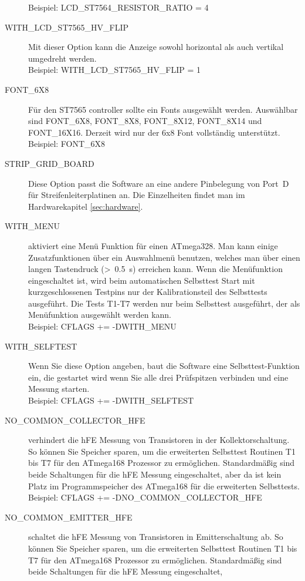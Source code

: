 \begin{description}
Beispiel: LCD\_ST7564\_RESISTOR\_RATIO = 4
  \item[WITH\_LCD\_ST7565\_HV\_FLIP] Mit dieser Option kann die Anzeige sowohl horizontal als auch vertikal
umgedreht werden.\\
Beispiel: WITH\_LCD\_ST7565\_HV\_FLIP = 1
  \item[FONT\_6X8] Für den ST7565 controller sollte ein Fonts ausgewählt werden.
Auswählbar  sind FONT\_6X8, FONT\_8X8, FONT\_8X12, FONT\_8X14 und FONT\_16X16.
Derzeit wird nur der 6x8 Font vollständig unterstützt.\\
Beispiel: FONT\_6X8
  \item[STRIP\_GRID\_BOARD] Diese Option passt die Software an eine andere Pinbelegung von Port~D für Streifenleiterplatinen an.
Die Einzelheiten findet man im Hardwarekapitel \ref{sec:hardware}.
  \item[WITH\_MENU] aktiviert eine Menü Funktion für einen ATmega328.  Man kann einige Zusatzfunktionen über ein
Auswahlmenü benutzen, welches man über einen langen Tastendruck (\textgreater~0.5~s) erreichen kann.
Wenn die Menüfunktion eingeschaltet ist, wird beim automatischen Selbsttest Start mit kurzgeschlossenen Testpins
 nur der Kalibrationsteil des Selbsttests ausgeführt.
Die Tests T1-T7 werden nur beim Selbsttest ausgeführt, der als Menüfunktion ausgewählt werden kann.\\
Beispiel: CFLAGS += -DWITH\_MENU
  \item[WITH\_SELFTEST] Wenn Sie diese Option angeben, baut die Software eine Selbsttest-Funktion ein, die gestartet wird
wenn Sie alle drei Prüfspitzen verbinden und eine Messung starten.\\
Beispiel: CFLAGS += -DWITH\_SELFTEST
  \item[NO\_COMMON\_COLLECTOR\_HFE] verhindert die hFE Messung von Transistoren in der Kollektorschaltung.
So können Sie Speicher sparen, um die erweiterten Selbsttest Routinen T1 bis T7 für den ATmega168 Prozessor zu ermöglichen.
Standardmäßig sind beide Schaltungen für die hFE Messung eingeschaltet,
aber da ist kein Platz im Programmspeicher des ATmega168 für die erweiterten Selbsttests.\\
Beispiel: CFLAGS += -DNO\_COMMON\_COLLECTOR\_HFE
  \item[NO\_COMMON\_EMITTER\_HFE] schaltet die hFE Messung von Transistoren in Emitterschaltung ab.
So können Sie Speicher sparen, um die erweiterten Selbsttest Routinen T1 bis T7 für den ATmega168 Prozessor zu ermöglichen.
Standardmäßig sind beide Schaltungen für die hFE Messung eingeschaltet,

\end{description}
